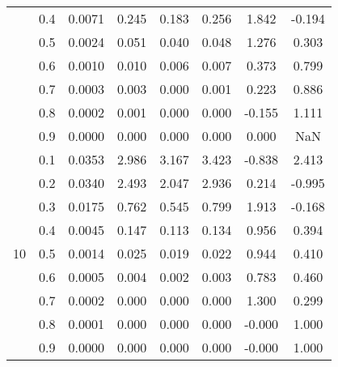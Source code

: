 \documentclass[11pt,a4paper]{report}
\begin{document}
\begin{longtable}{ | c | c || c | c | c | c | c | c | }
 & 0.4 & 0.0071 & 0.245 & 0.183 & 0.256 & 1.842 & -0.194 \\
 & 0.5 & 0.0024 & 0.051 & 0.040 & 0.048 & 1.276 & 0.303 \\
 & 0.6 & 0.0010 & 0.010 & 0.006 & 0.007 & 0.373 & 0.799 \\
 & 0.7 & 0.0003 & 0.003 & 0.000 & 0.001 & 0.223 & 0.886 \\
 & 0.8 & 0.0002 & 0.001 & 0.000 & 0.000 & -0.155 & 1.111 \\
 & 0.9 & 0.0000 & 0.000 & 0.000 & 0.000 & 0.000 & NaN \\
 \hline
\multirow{9}{*}{10} & 0.1 & 0.0353 & 2.986 & 3.167 & 3.423 & -0.838 & 2.413 \\
 & 0.2 & 0.0340 & 2.493 & 2.047 & 2.936 & 0.214 & -0.995 \\
 & 0.3 & 0.0175 & 0.762 & 0.545 & 0.799 & 1.913 & -0.168 \\
 & 0.4 & 0.0045 & 0.147 & 0.113 & 0.134 & 0.956 & 0.394 \\
 & 0.5 & 0.0014 & 0.025 & 0.019 & 0.022 & 0.944 & 0.410 \\
 & 0.6 & 0.0005 & 0.004 & 0.002 & 0.003 & 0.783 & 0.460 \\
 & 0.7 & 0.0002 & 0.000 & 0.000 & 0.000 & 1.300 & 0.299 \\
 & 0.8 & 0.0001 & 0.000 & 0.000 & 0.000 & -0.000 & 1.000 \\
 & 0.9 & 0.0000 & 0.000 & 0.000 & 0.000 & -0.000 & 1.000 \\
 \hline
\hline
\end{longtable}
\end{document}
